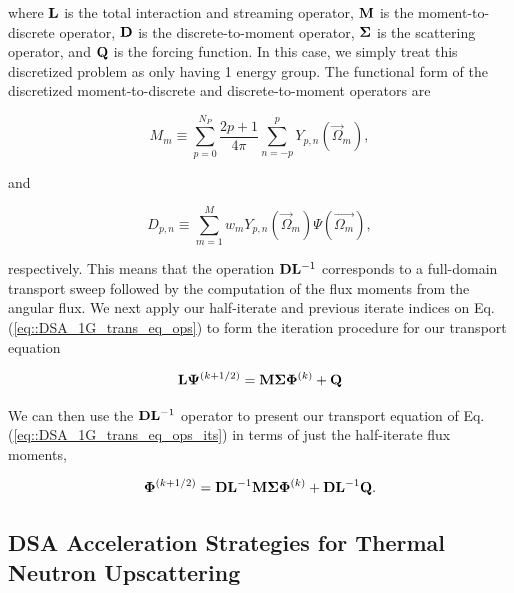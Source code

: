 \noindent where ${\bf L}$ is the total interaction and streaming operator, ${\bf M}$ is the moment-to-discrete operator, ${\bf D}$ is the discrete-to-moment operator, ${\bf \Sigma}$ is the scattering operator, and ${\bf Q}$ is the forcing function. In this case, we simply treat this discretized problem as only having 1 energy group. The functional form of the discretized moment-to-discrete and discrete-to-moment operators are

\begin{equation}
\label{eq::DSA_1G_M}
M_m \equiv \sum_{p=0}^{N_P} \frac{2p + 1}{4 \pi}   \sum_{n=-p}^{p}  Y_{p,n} (  \vec{\Omega}_m )   ,
\end{equation}

\noindent and 

\begin{equation}
\label{eq::DSA_1G_D}
D_{p,n} \equiv \sum_{m=1}^M w_m Y_{p,n} (\vec{\Omega}_m)  \Psi(\vec{\Omega_m}) ,
\end{equation}

\noindent respectively. This means that the operation ${\bf D} {\bf L}^{-1}$ corresponds to a full-domain transport sweep followed by the computation of the flux moments from the angular flux. We next apply our half-iterate and previous iterate indices on Eq. (\ref{eq::DSA_1G_trans_eq_ops}) to form the iteration procedure for our transport equation

\begin{equation}
\label{eq::DSA_1G_trans_eq_ops_its}
{\bf L} {\bf \Psi}^{(k+1/2)}= {\bf M} {\bf \Sigma} {\bf \Phi}^{(k)}  +    {\bf Q} 
\end{equation}

\noindent We can then use the ${\bf D} {\bf L}^{-1}$ operator to present our transport equation of Eq. (\ref{eq::DSA_1G_trans_eq_ops_its}) in terms of just the half-iterate flux moments,

\begin{equation}
\label{eq::DSA_1G_trans_eq_ops_mom}
 {\bf \Phi}^{(k+1/2)}  =  {\bf D} {\bf L}^{-1} {\bf M} {\bf \Sigma}  {\bf \Phi}^{(k)} +  {\bf D} {\bf L}^{-1}   {\bf Q} .
\end{equation}

\subsection{DSA Acceleration Strategies for Thermal Neutron Upscattering}
\label{sec::DSA_DSA_MG}

